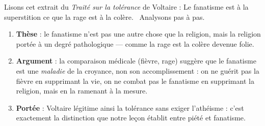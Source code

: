 \documentclass[11pt]{article}
\begin{document}
\begin{experience}
Lisons cet extrait du \emph{Traité sur la tolérance} de Voltaire : \guillemotleft Le fanatisme est à la superstition ce que la rage est à la colère. \guillemotright\ Analysons pas à pas.
\begin{enumerate}
\item \textbf{Thèse} : le fanatisme n'est pas une autre chose que la religion, mais la religion portée à un degré pathologique — comme la rage est la colère devenue folie.
\item \textbf{Argument} : la comparaison médicale (fièvre, rage) suggère que le fanatisme est une \emph{maladie} de la croyance, non son accomplissement : on ne guérit pas la fièvre en supprimant la vie, on ne combat pas le fanatisme en supprimant la religion, mais en la ramenant à la mesure.
\item \textbf{Portée} : Voltaire légitime ainsi la tolérance sans exiger l'athéisme : c'est exactement la distinction que notre leçon établit entre piété et fanatisme.
\end{enumerate}
\end{experience}
\end{document}
